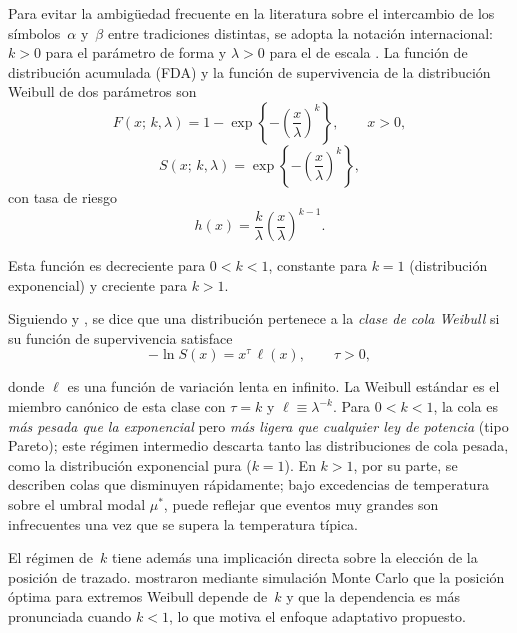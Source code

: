 \documentclass[APA,STIX1COL]{WileyNJD-v2}
\begin{document}
{Para evitar la ambigüedad frecuente en la literatura sobre el
intercambio de los símbolos~$\alpha$ y~$\beta$ entre tradiciones
distintas, se adopta la notación internacional: $k>0$ para el
parámetro de forma y $\lambda>0$ para el de escala
\citep[véase también][]{makkonen2014}. La función de distribución
acumulada (FDA) y la función de supervivencia de la distribución
Weibull de dos parámetros son
\begin{equation}\label{eq:fda}
F(x;\,k,\lambda)
  = 1 - \exp\!\left\{-\left(\frac{x}{\lambda}\right)^{\!k}\right\},
  \qquad x > 0,
\end{equation}
\begin{equation}\label{eq:supervivencia}
S(x;\,k,\lambda)
  = \exp\!\left\{-\left(\frac{x}{\lambda}\right)^{\!k}\right\},
\end{equation}
con tasa de riesgo
\begin{equation}\label{eq:hazard}
h(x) = \frac{k}{\lambda}\left(\frac{x}{\lambda}\right)^{k-1}.
\end{equation}

\medskip
Esta función es decreciente para $0<k<1$, constante para $k=1$
(distribución exponencial) y creciente para $k>1$.

Siguiendo \citet{gardes2005} y \citet{diebolt2008}, se dice que una
distribución pertenece a la \emph{clase de cola Weibull} si su función
de supervivencia satisface
\begin{equation}\label{eq:cola_weibull}
-\ln S(x) = x^\tau\,\ell(x),\qquad \tau>0,
\end{equation}

\medskip

donde $\ell$ es una función de variación lenta en infinito. La Weibull
estándar es el miembro canónico de esta clase con $\tau=k$ y
$\ell\equiv\lambda^{-k}$. Para $0<k<1$, la cola es \emph{más pesada
que la exponencial} pero \emph{más ligera que cualquier ley de
potencia} (tipo Pareto); este régimen intermedio descarta tanto las
distribuciones de cola pesada, como la distribución
exponencial pura ($k=1$). En $k>1$, por su parte, se describen colas que disminuyen rápidamente; bajo excedencias de temperatura sobre el umbral modal $\mu^*$, puede reflejar
que eventos muy grandes son infrecuentes una vez que se supera la temperatura típica.

El régimen de~$k$ tiene además una implicación directa sobre la
elección de la posición de trazado. \citet{goda1988,goda2010}
mostraron mediante simulación Monte Carlo que la posición óptima para
extremos Weibull depende de~$k$ y que la dependencia es más pronunciada
cuando $k<1$, lo que motiva el enfoque adaptativo propuesto.

}
\end{document}
